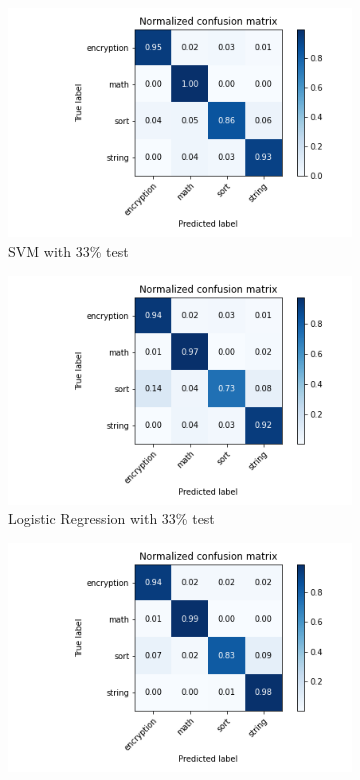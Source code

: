 \documentclass[11pt]{article}
\begin{document}
\begin{figure}
\centering
\begin{subfigure}{.5\textwidth}
  \centering
  \includegraphics[width=1\linewidth]{svm_30_70.png}
  \caption{SVM with 33\% test}
  \label{fig:svm}
\end{subfigure}%
\begin{subfigure}{.5\textwidth}
  \centering
  \includegraphics[width=1\linewidth]{regression_30_70.png}
  \caption{Logistic Regression with 33\% test}
  \label{fig:logreg}
\end{subfigure}
\begin{subfigure}{.5\textwidth}
  \centering
  \includegraphics[width=1\linewidth]{decision_tree_30_70.png}

\end{subfigure}
\end{figure}
\end{document}
